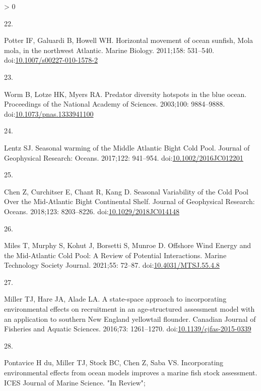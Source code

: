 \documentclass[
  10pt,
]{article}
\newlength{\cslhangindent}
\newlength{\csllabelwidth}
\newenvironment{CSLReferences}[2] %
 {%
  \setlength{\parindent}{0pt}
  \ifodd #1 \everypar{\setlength{\hangindent}{\cslhangindent}}\ignorespaces\fi
  \ifnum #2 > 0
  \setlength{\parskip}{#2\baselineskip}
  \fi
 }%
 {}
\newcommand{\CSLLeftMargin}[1]{\parbox[t]{\csllabelwidth}{#1}}
\newcommand{\CSLRightInline}[1]{\parbox[t]{\linewidth - \csllabelwidth}{#1}\break}
\begin{document}
\begin{CSLReferences}{0}{0}
\leavevmode\hypertarget{ref-potter_horizontal_2011}{}%
\CSLLeftMargin{22. }
\CSLRightInline{Potter IF, Galuardi B, Howell WH. Horizontal movement of
ocean sunfish, {Mola} mola, in the northwest {Atlantic}. Marine Biology.
2011;158: 531--540.
doi:\href{https://doi.org/10.1007/s00227-010-1578-2}{10.1007/s00227-010-1578-2}}

\leavevmode\hypertarget{ref-worm_predator_2003}{}%
\CSLLeftMargin{23. }
\CSLRightInline{Worm B, Lotze HK, Myers RA. Predator diversity hotspots
in the blue ocean. Proceedings of the National Academy of Sciences.
2003;100: 9884--9888.
doi:\href{https://doi.org/10.1073/pnas.1333941100}{10.1073/pnas.1333941100}}

\leavevmode\hypertarget{ref-lentz_seasonal_2017}{}%
\CSLLeftMargin{24. }
\CSLRightInline{Lentz SJ. Seasonal warming of the {Middle} {Atlantic}
{Bight} {Cold} {Pool}. Journal of Geophysical Research: Oceans.
2017;122: 941--954.
doi:\href{https://doi.org/10.1002/2016JC012201}{10.1002/2016JC012201}}

\leavevmode\hypertarget{ref-chen_seasonal_2018}{}%
\CSLLeftMargin{25. }
\CSLRightInline{Chen Z, Curchitser E, Chant R, Kang D. Seasonal
{Variability} of the {Cold} {Pool} {Over} the {Mid}-{Atlantic} {Bight}
{Continental} {Shelf}. Journal of Geophysical Research: Oceans.
2018;123: 8203--8226.
doi:\href{https://doi.org/10.1029/2018JC014148}{10.1029/2018JC014148}}

\leavevmode\hypertarget{ref-miles_offshore_2021}{}%
\CSLLeftMargin{26. }
\CSLRightInline{Miles T, Murphy S, Kohut J, Borsetti S, Munroe D.
Offshore {Wind} {Energy} and the {Mid}-{Atlantic} {Cold} {Pool}: {A}
{Review} of {Potential} {Interactions}. Marine Technology Society
Journal. 2021;55: 72--87.
doi:\href{https://doi.org/10.4031/MTSJ.55.4.8}{10.4031/MTSJ.55.4.8}}

\leavevmode\hypertarget{ref-miller_state-space_2016}{}%
\CSLLeftMargin{27. }
\CSLRightInline{Miller TJ, Hare JA, Alade LA. A state-space approach to
incorporating environmental effects on recruitment in an age-structured
assessment model with an application to southern {New} {England}
yellowtail flounder. Canadian Journal of Fisheries and Aquatic Sciences.
2016;73: 1261--1270.
doi:\href{https://doi.org/10.1139/cjfas-2015-0339}{10.1139/cjfas-2015-0339}}

\leavevmode\hypertarget{ref-du_pontavice_incorporating_nodate}{}%
\CSLLeftMargin{28. }
\CSLRightInline{Pontavice H du, Miller TJ, Stock BC, Chen Z, Saba VS.
Incorporating environmental effects from ocean models improves a marine
fish stock assessment. ICES Journal of Marine Science. "In Review"; }


\end{CSLReferences}
\end{document}
